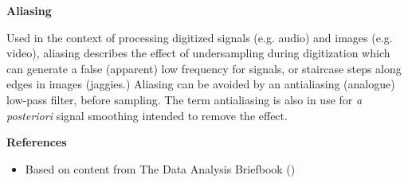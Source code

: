 \documentclass{article}
\begin{document}
{\bf Aliasing}

Used in the context of processing digitized signals (e.g. audio) and images (e.g. video), aliasing describes the effect of undersampling during digitization which can generate a false (apparent) low frequency for signals, or staircase steps along edges in images (jaggies.) Aliasing can be avoided by an antialiasing (analogue) low-pass filter, before sampling. The term antialiasing is also in use for \emph{a posteriori} signal smoothing intended to remove the effect.

{\bf References}

\begin{itemize}
\item Based on content from The Data Analysis Briefbook ()
\end{itemize}
\end{document}
